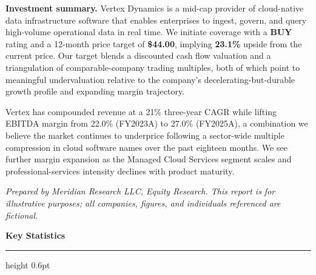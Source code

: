 \vspace{6pt}
\noindent\begin{minipage}[t]{0.58\linewidth}

\vspace{5pt}
\textbf{Investment summary.} Vertex Dynamics is a mid-cap provider of cloud-native data infrastructure software that enables enterprises to ingest, govern, and query high-volume operational data in real time. We initiate coverage with a \textbf{BUY} rating and a 12-month price target of \textbf{\$44.00}, implying \textbf{23.1\%} upside from the current price. Our target blends a discounted cash flow valuation and a triangulation of comparable-company trading multiples, both of which point to meaningful undervaluation relative to the company's decelerating-but-durable growth profile and expanding margin trajectory.

Vertex has compounded revenue at a 21\% three-year CAGR while lifting EBITDA margin from 22.0\% (FY2023A) to 27.0\% (FY2025A), a combination we believe the market continues to underprice following a sector-wide multiple compression in cloud software names over the past eighteen months. We see further margin expansion as the Managed Cloud Services segment scales and professional-services intensity declines with product maturity.

\vspace{2pt}
{\scriptsize\color{slateink}\itshape Prepared by Meridian Research LLC, Equity Research. This report is for illustrative purposes; all companies, figures, and individuals referenced are fictional.}
\end{minipage}\hfill
\begin{minipage}[t]{0.38\linewidth}
\begin{statbox}
{\sffamily\bfseries\color{meridiannavy}\large Key Statistics}\par\vspace{2pt}
{\color{vertexteal}\hrule height 0.6pt}\par\vspace{5pt}
\end{statbox}
\end{minipage}

\vspace{3pt}
